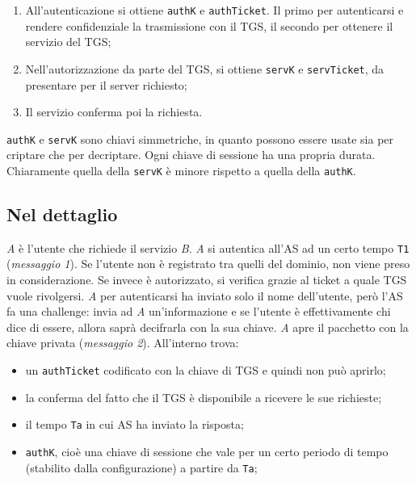 \begin{enumerate}
      \item All’autenticazione si ottiene \verb|authK| e \verb|authTicket|.
            Il primo per autenticarsi e rendere
            confidenziale la trasmissione con il TGS, il secondo per ottenere
            il servizio del TGS;
      \item Nell’autorizzazione da parte del TGS, si ottiene \verb|servK| e
            \verb|servTicket|, da presentare per il
            server richiesto;
      \item Il servizio conferma poi la richiesta.
\end{enumerate}

\verb|authK| e \verb|servK| sono chiavi simmetriche, in quanto possono essere
usate sia per criptare che per decriptare. Ogni chiave di sessione ha una
propria durata.
Chiaramente quella della \verb|servK| è minore rispetto a quella
della \verb|authK|.

\subsection{Nel dettaglio}

\textit{A} è l’utente che richiede il servizio \textit{B}.
\textit{A} si autentica all’AS ad un certo tempo \verb|T1|
(\textit{messaggio 1}). Se l’utente non è registrato tra quelli del dominio,
non viene preso in considerazione. Se invece è autorizzato, si verifica grazie
al ticket a quale TGS vuole rivolgersi.
\textit{A} per autenticarsi ha inviato solo il nome dell’utente, però l’AS fa
una challenge: invia ad \textit{A} un’informazione e se l’utente è
effettivamente chi dice di essere, allora saprà decifrarla con la sua chiave.
\textit{A} apre il pacchetto con la chiave privata (\textit{messaggio 2}).
All’interno trova:

\begin{itemize}
      \item un \verb|authTicket| codificato con la chiave di TGS e quindi non può
            aprirlo;
      \item la conferma del fatto che il TGS è disponibile a ricevere le sue
            richieste;
      \item il tempo \verb|Ta| in cui AS ha inviato la risposta;
      \item \verb|authK|, cioè una chiave di sessione che vale per un certo periodo di
            tempo (stabilito dalla configurazione) a partire da \verb|Ta|;
\end{itemize}

